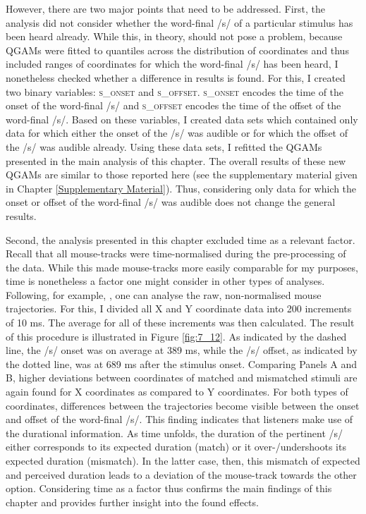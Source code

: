 However, there are two major points that need to be addressed. First, the analysis did not consider whether the word-final /s/ of a particular stimulus has been heard already. While this, in theory, should not pose a problem, because QGAMs were fitted to quantiles across the distribution of coordinates and thus included ranges of coordinates for which the word-final /s/ has been heard, I nonetheless checked whether a difference in results is found. For this, I created two binary variables: \textsc{s\_onset} and \textsc{s\_offset}. \textsc{s\_onset} encodes the time of the onset of the word-final /s/ and \textsc{s\_offset} encodes the time of the offset of the word-final /s/. Based on these variables, I created data sets which contained only data for which either the onset of the /s/ was audible or for which the offset of the /s/ was audible already. Using these data sets, I refitted the QGAMs presented in the main analysis of this chapter. The overall results of these new QGAMs are similar to those reported here (see the supplementary material given in Chapter \ref{Supplementary Material}). Thus, considering only data for which the onset or offset of the word-final /s/ was audible does not change the general results.

Second, the analysis presented in this chapter excluded time as a relevant factor. Recall that all mouse-tracks were time-normalised during the pre-processing of the data. While this made mouse-tracks more easily comparable for my purposes, time is nonetheless a factor one might consider in other types of analyses. Following, for example, \citet{Blazej2015}, one can analyse the raw, non-normalised mouse trajectories. For this, I divided all X and Y coordinate data into 200 increments of 10 ms. The average for all of these increments was then calculated. The result of this procedure is illustrated in Figure \ref{fig:7_12}. As indicated by the dashed line, the /s/ onset was on average at 389 ms, while the /s/ offset, as indicated by the dotted line, was at 689 ms after the stimulus onset. Comparing Panels A and B, higher deviations between coordinates of matched and mismatched stimuli are again found for X coordinates as compared to Y coordinates. For both types of coordinates, differences between the trajectories become visible between the onset and offset of the word-final /s/. This finding indicates that listeners make use of the durational information. As time unfolds, the duration of the pertinent /s/ either corresponds to its expected duration (match) or it over-/undershoots its expected duration (mismatch). In the latter case, then, this mismatch of expected and perceived duration leads to a deviation of the mouse-track towards the other option. Considering time as a factor thus confirms the main findings of this chapter and provides further insight into the found effects.

